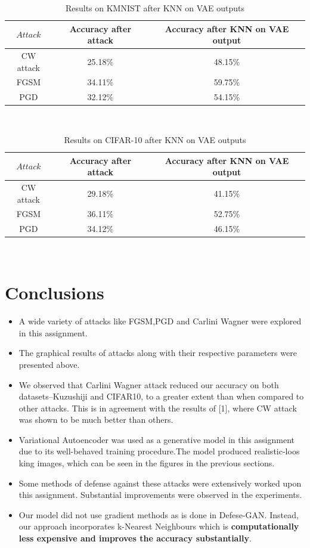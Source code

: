 \documentclass[11pt]{article}
\begin{document}
\begin{table}[!h]
\centering
\begin{tabular}{c|c|c}
$Attack$& Accuracy after attack & Accuracy after KNN on VAE output\\\hline
CW attack	& 25.18\% & 48.15\% \\
FGSM & 34.11\%  & 59.75\% \\
PGD & 32.12\%  & 54.15\% 
\end{tabular}
\caption{\label{Table 1: }Results on KMNIST after KNN on VAE outputs}
\end{table}
\\

\begin{table}[!h]
\centering
\begin{tabular}{c|c|c}
$Attack$& Accuracy after attack & Accuracy after KNN on VAE output\\\hline
CW attack	& 29.18\% & 41.15\% \\
FGSM & 36.11\%  & 52.75\% \\
PGD & 34.12\%  & 46.15\% 
\end{tabular}
\caption{\label{Table 1: }Results on CIFAR-10 after KNN on VAE outputs}
\end{table}
\\

\section{Conclusions}

\begin{itemize}
    \item A wide variety of attacks like FGSM,PGD and Carlini Wagner were explored in this assignment.
    \item The graphical results of attacks along with their respective parameters were presented above. 
    \item We observed that Carlini Wagner attack reduced our accuracy on both datasets--Kuzushiji and CIFAR10, to a greater extent than when compared to other attacks. This is in agreement with the results of [1], where CW attack was shown to be much better than others. 
    \item Variational Autoencoder was used as a generative model in this assignment due to its well-behaved training procedure.The model produced realistic-loos king images, which can be seen in the figures in the previous sections.
    \item Some methods of defense against these attacks were extensively worked upon this assignment. Substantial improvements were observed in the experiments. 
    \item Our model did not use gradient methods as is done in Defese-GAN. Instead, our approach incorporates k-Nearest Neighbours which is \textbf{computationally less expensive and improves the accuracy substantially}.
\end{itemize}
\end{document}
